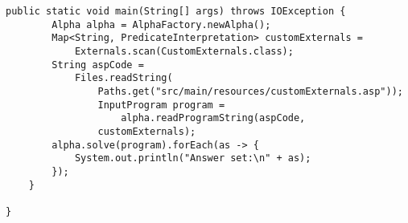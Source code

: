 \begin{example}
\begin{lstlisting}[style=java, label={lst:user-supplied-externals-main}]
	public static void main(String[] args) throws IOException {
		Alpha alpha = AlphaFactory.newAlpha();
		Map<String, PredicateInterpretation> customExternals =
			Externals.scan(CustomExternals.class);
		String aspCode =
			Files.readString(
				Paths.get("src/main/resources/customExternals.asp"));
				InputProgram program =
					alpha.readProgramString(aspCode,
				customExternals);
		alpha.solve(program).forEach(as -> {
			System.out.println("Answer set:\n" + as);
		});
	}

}
\end{lstlisting}
\end{example}
